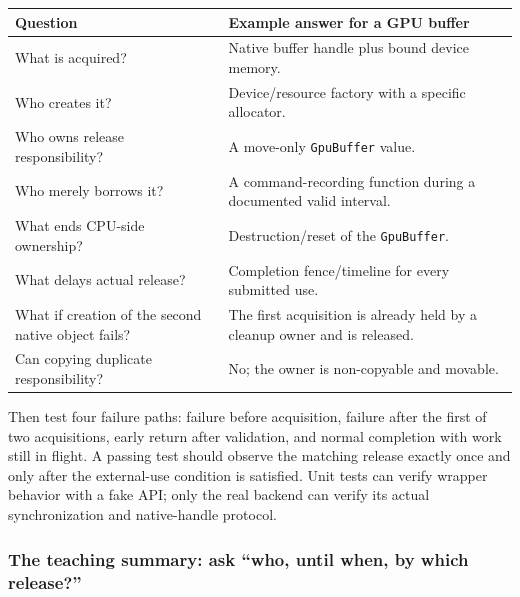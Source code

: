 {\def\LTcaptype{none} %
\begin{longtable}[]{@{}
  >{\raggedright\arraybackslash}p{}
  >{\raggedright\arraybackslash}p{}@{}}
\toprule\noalign{}
\begin{minipage}[b]{\linewidth}\raggedright
Question
\end{minipage} & \begin{minipage}[b]{\linewidth}\raggedright
Example answer for a GPU buffer
\end{minipage} \\
\midrule\noalign{}
\endhead
\bottomrule\noalign{}
\endlastfoot
What is acquired? & Native buffer handle plus bound device memory. \\
Who creates it? & Device/resource factory with a specific allocator. \\
Who owns release responsibility? & A move-only \texttt{GpuBuffer} value. \\
Who merely borrows it? & A command-recording function during a documented valid interval. \\
What ends CPU-side ownership? & Destruction/reset of the \texttt{GpuBuffer}. \\
What delays actual release? & Completion fence/timeline for every submitted use. \\
What if creation of the second native object fails? & The first acquisition is already held by a cleanup owner and is released. \\
Can copying duplicate responsibility? & No; the owner is non-copyable and movable. \\
\end{longtable}
}

Then test four failure paths: failure before acquisition, failure after the first of two acquisitions, early return after validation, and normal completion with work still in flight. A passing test should observe the matching release exactly once and only after the external-use condition is satisfied. Unit tests can verify wrapper behavior with a fake API; only the real backend can verify its actual synchronization and native-handle protocol.

\subsubsection{The teaching summary: ask ``who, until when, by which release?''}\label{the-teaching-summary-ask-who-until-when-by-which-release}

